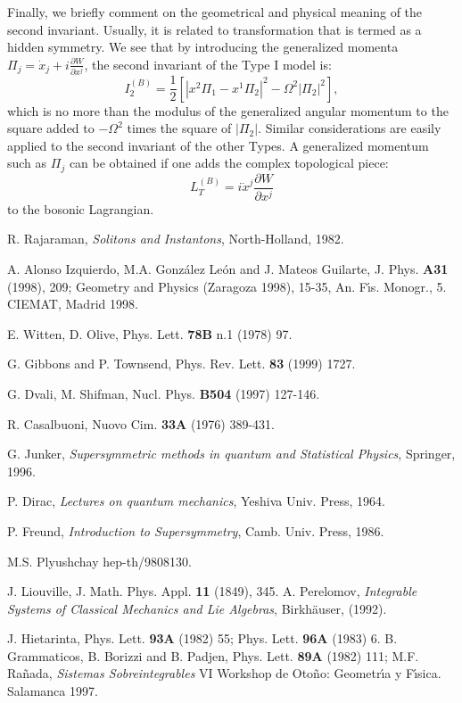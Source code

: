 \documentclass[a4paper,11pt,twoside]{article}
\begin{document}
Finally, we briefly comment on the geometrical and physical
meaning of the second invariant. Usually, it is related to
transformation that is termed as a hidden symmetry. We see that by
introducing the generalized momenta $\Pi_j={\dot
x}_j+i\frac{\partial W}{\partial x^j}$, the second invariant of
the Type I model is:
\[
I_2^{(B)}=\frac{1}{2} \left[ \left| x^2\Pi_1-x^1\Pi_2
\right|^2-\Omega^2 \left| \Pi_2 \right|^2 \right],
\]
which is no more than the modulus of the generalized angular
momentum to the square added to $-\Omega^2$ times the square of
$|\Pi_2|$. Similar considerations are easily applied to the second
invariant of the other Types. A generalized momentum such as
$\Pi_j$ can be obtained if one adds the complex topological piece:
\[
L_T^{(B)}=i{\dot x}^j\frac{\partial W}{\partial x^j}
\]
to the bosonic Lagrangian.
\begin{thebibliography}{99}

 \sc R. Rajaraman, {\em Solitons and Instantons}, \rm North-Holland, 1982.

 \sc A. Alonso Izquierdo, M.A. Gonz\'alez Le\'on and J. Mateos Guilarte, \rm J. Phys. {\bf A31} (1998), 209; \rm Geometry and Physics (Zaragoza 1998), 15-35, An. F\'{\i}s. Monogr., 5. CIEMAT, Madrid 1998.

 \sc E. Witten, D. Olive, \rm Phys. Lett. {\bf 78B} n.1 (1978) 97.

 \sc G. Gibbons and P. Townsend, \rm Phys. Rev. Lett. {\bf 83} (1999) 1727.

 \sc G. Dvali, M. Shifman, \rm Nucl. Phys. {\bf B504} (1997) 127-146.

 \sc R. Casalbuoni, \rm Nuovo Cim. {\bf 33A} (1976) 389-431.

 \sc G. Junker, {\em Supersymmetric methods in quantum and Statistical Physics}, \rm Springer, 1996.

 \sc P. Dirac, {\em Lectures on quantum mechanics}, \rm Yeshiva Univ. Press, 1964.

 \sc P. Freund, {\em Introduction to Supersymmetry}, \rm Camb. Univ. Press, 1986.

 \sc M.S. Plyushchay \rm hep-th/9808130.

 \sc J. Liouville, \rm J. Math. Phys. Appl. {\bf 11} (1849), 345. \sc A. Perelomov, {\em Integrable Systems of Classical
Mechanics and Lie Algebras}, \rm Birkh\"auser, (1992).

 \sc J. Hietarinta, \rm Phys. Lett. {\bf 93A} (1982) 55; \rm Phys. Lett. {\bf 96A} (1983) 6. \sc B. Grammaticos, B. Borizzi and B. Padjen, \rm Phys. Lett. {\bf 89A} (1982) 111; \sc M.F. Ra\~nada, {\em Sistemas Sobreintegrables} \rm VI Workshop de Oto\~no: Geometr\'{\i}a y F\'{\i}sica. Salamanca 1997.

\end{thebibliography}
\end{document}
